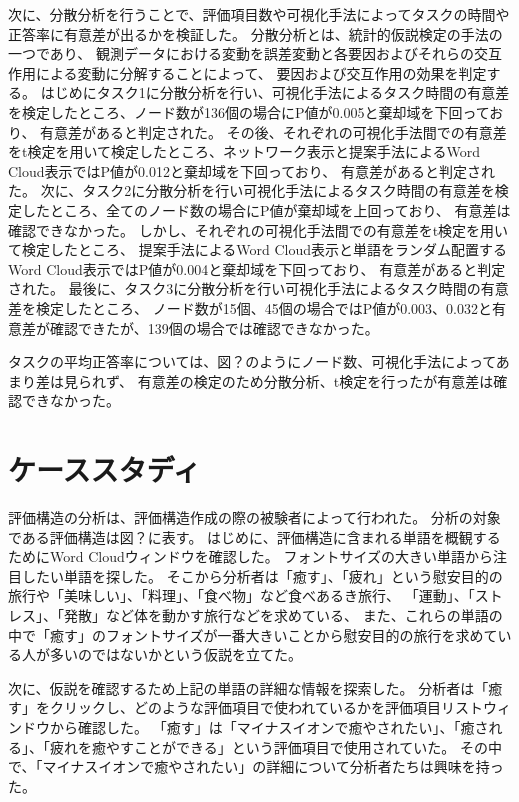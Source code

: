 \documentclass[syuuron]{kuee}
\begin{document}
	次に、分散分析を行うことで、評価項目数や可視化手法によってタスクの時間や正答率に有意差が出るかを検証した。
	分散分析とは、統計的仮説検定の手法の一つであり、
	観測データにおける変動を誤差変動と各要因およびそれらの交互作用による変動に分解することによって、
	要因および交互作用の効果を判定する。
	はじめにタスク1に分散分析を行い、可視化手法によるタスク時間の有意差を検定したところ、ノード数が136個の場合にP値が0.005と棄却域を下回っており、
	有意差があると判定された。
	その後、それぞれの可視化手法間での有意差をt検定を用いて検定したところ、ネットワーク表示と提案手法によるWord Cloud表示ではP値が0.012と棄却域を下回っており、
	有意差があると判定された。
	次に、タスク2に分散分析を行い可視化手法によるタスク時間の有意差を検定したところ、全てのノード数の場合にP値が棄却域を上回っており、
	有意差は確認できなかった。
	しかし、それぞれの可視化手法間での有意差をt検定を用いて検定したところ、
	提案手法によるWord Cloud表示と単語をランダム配置するWord Cloud表示ではP値が0.004と棄却域を下回っており、
	有意差があると判定された。
	最後に、タスク3に分散分析を行い可視化手法によるタスク時間の有意差を検定したところ、
	ノード数が15個、45個の場合ではP値が0.003、0.032と有意差が確認できたが、139個の場合では確認できなかった。
	
	タスクの平均正答率については、図？のようにノード数、可視化手法によってあまり差は見られず、
	有意差の検定のため分散分析、t検定を行ったが有意差は確認できなかった。
		
	\section{ケーススタディ}
	評価構造の分析は、評価構造作成の際の被験者によって行われた。
	分析の対象である評価構造は図？に表す。
	はじめに、評価構造に含まれる単語を概観するためにWord Cloudウィンドウを確認した。
	フォントサイズの大きい単語から注目したい単語を探した。
	そこから分析者は「癒す」、「疲れ」という慰安目的の旅行や「美味しい」、「料理」、「食べ物」など食べあるき旅行、
	「運動」、「ストレス」、「発散」など体を動かす旅行などを求めている、
	また、これらの単語の中で「癒す」のフォントサイズが一番大きいことから慰安目的の旅行を求めている人が多いのではないかという仮説を立てた。
	
	次に、仮説を確認するため上記の単語の詳細な情報を探索した。
	分析者は「癒す」をクリックし、どのような評価項目で使われているかを評価項目リストウィンドウから確認した。
	「癒す」は「マイナスイオンで癒やされたい」、「癒される」、「疲れを癒やすことができる」という評価項目で使用されていた。
	その中で、「マイナスイオンで癒やされたい」の詳細について分析者たちは興味を持った。
	
\end{document}
